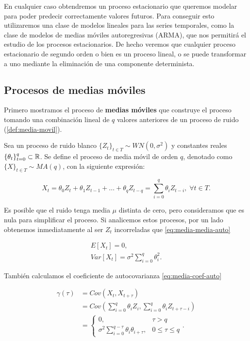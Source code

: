 En cualquier caso obtendremos un proceso estacionario que queremos modelar para poder predecir correctamente valores futuros. Para conseguir esto utilizaremos una clase de modelos lineales para las series temporales, como la clase de modelos de medias móviles autoregresivas (ARMA), que nos permitirá el estudio de los procesos estacionarios. De hecho veremos que cualquier proceso  estacionario de segundo orden o bien es un proceso lineal, o se puede transformar a uno mediante la eliminación de una componente determinista.

\subsection{Procesos de medias móviles}

Primero mostramos el proceso de \textbf{medias móviles} que construye el proceso tomando una combinación lineal de $q$ valores anteriores de un proceso de ruido (\autoref{def:media-movil}).

\begin{definicion}
  Sea un proceso de ruido blanco $\{Z_t\}_{t \in T} \sim WN(0, \sigma^2)$ y constantes reales $\{\theta_t\}_{t = 0}^q \subset \mathbb{R}$. Se define el proceso de media móvil de orden $q$, denotado como $\{X\}_{t \in T} \sim MA(q)$, con la siguiente expresión:

  $$X_t = \theta_0 Z_t + \theta_1 Z_{t - 1} + \ldots + \theta_q Z_{t - q} = \sum \limits^q_{i = 0} \theta_i Z_{t - i}, \; \forall t \in T.$$
  \label{def:media-movil}
\end{definicion}

Es posible que el ruido tenga media $\mu$ distinta de cero, pero consideramos que es nula para simplificar el proceso. Si analicemos estos procesos, por un lado obtenemos inmediatamente al ser $Z_t$ incorreladas que \eqref{eq:media-media-auto}

\begin{gather}
  E[X_t] = 0, \\
  Var[X_t] = \sigma^2 \sum \limits^q_{i = 0} \theta_i^2.
  \label{eq:media-media-auto}
\end{gather}

También calculamos el coeficiente de autocovarianza \eqref{eq:media-coef-auto}

\begin{equation}
  \begin{aligned}
    \gamma(\tau) & = Cov(X_t, X_{t + \tau}) \\
    & = Cov\left(\sum \limits^q_{i = 0} \theta_i Z_i, \sum \limits^q_{i = 0} \theta_i Z_{t + \tau - i}\right) \\
    & = \begin{cases}
      0, & \tau > q \\
      \sigma^2 \sum \limits^{q - \tau}_{i = 0} \theta_i \theta_{i + \tau}, & 0 \leq \tau \leq q
    \end{cases}.
  \end{aligned}
\label{eq:media-coef-auto}
\end{equation}

